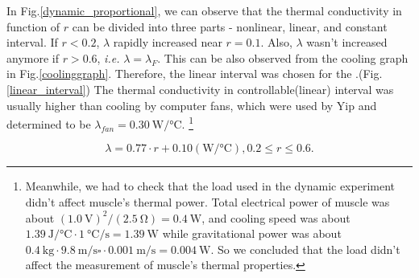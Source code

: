 In Fig.\ref{dynamic_proportional}, we can observe that the thermal conductivity in function of $r$ can be divided into three parts - nonlinear, linear, and constant interval. If $r<0.2$, $\lambda$ rapidly increased near $r=0.1$. Also, $\lambda$ wasn't increased anymore if $r>0.6$, {\it i.e.} $\lambda = \lambda_{F}$. This can be also observed from the cooling graph in Fig.\ref{coolinggraph}.
Therefore, the linear interval was chosen for the \Apcnospace.(Fig.\ref{linear_interval}) The thermal conductivity in controllable(linear) interval was usually higher than cooling by computer fans, which were used by Yip \etalspace and determined to be $\lambda_{fan}=\SI{0.30}{\watt\per\degreeCelsius}$.
\footnote{
	Meanwhile, we had to check that the load used in the dynamic experiment didn't affect muscle's thermal power. 
	Total electrical power of muscle was about $(\SI{1.0}{\volt})^2/(\SI{2.5}{\ohm})=\SI{0.4}{\watt}$, and cooling speed was about $\SI{1.39}{\joule\per\degreeCelsius} \cdot \SI{1}{\degreeCelsius\per\second}=\SI{1.39}{\watt}$ while gravitational power was about  $\SI{0.4}{\kilo\gram} \cdot  \SI{9.8}{\meter\per\second\square} \cdot \SI{0.001}{\meter\per\second}=\SI{0.004}{\watt}$. So we concluded that the load didn't affect the measurement of muscle's thermal properties.
}

\begin{equation} \label{lambda_control}
\lambda = 0.77\cdot r + 0.10 (\si{\watt\per\degreeCelsius}), 0.2\leq r \leq 0.6.
\end{equation}





